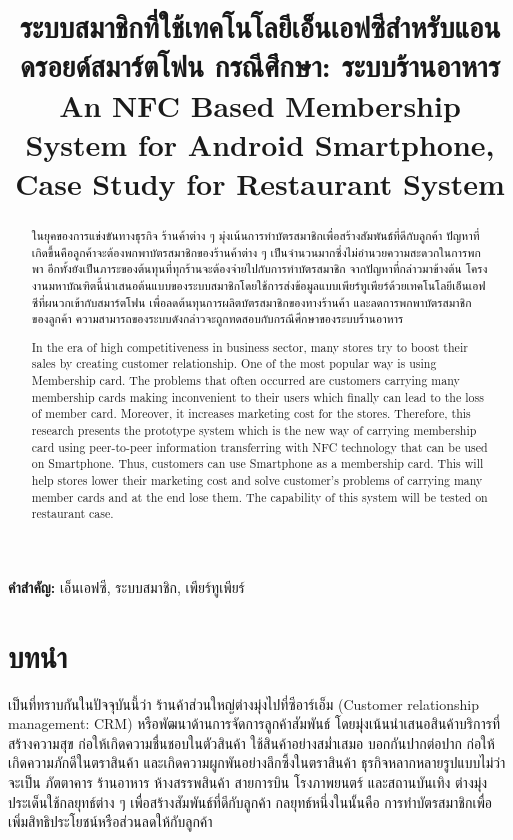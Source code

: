 \documentclass[12pt,a4paper,twocolumn]{article}
\title{ระบบสมาชิกที่ใช้เทคโนโลยีเอ็นเอฟซีสำหรับแอนดรอยด์สมาร์ตโฟน กรณีศึกษา: ระบบร้านอาหาร\\An NFC Based Membership System for Android Smartphone,\\Case Study for Restaurant System}
\author{}
\date{}
\renewcommand\abstractname{บทคัดย่อ}
\begin{document}
\maketitle
\thispagestyle{empty}
\pagestyle{empty}

\begin{abstract}
ในยุคของการแข่งขันทางธุรกิจ ร้านค้าต่าง ๆ มุ่งเน้นการทำบัตรสมาชิกเพื่อสร้างสัมพันธ์ที่ดีกับลูกค้า ปัญหาที่เกิดขึ้นคือลูกค้าจะต้องพกพาบัตรสมาชิกของร้านค้าต่าง ๆ เป็นจำนวนมากซึ่งไม่อำนวยความสะดวกในการพกพา อีกทั้งยังเป็นภาระของต้นทุนที่ทุกร้านจะต้องจ่ายไปกับการทำบัตรสมาชิก จากปัญหาที่กล่าวมาข้างต้น โครงงานมหาบัณฑิตนี้นำเสนอต้นแบบของระบบสมาชิกโดยใช้การส่งข้อมูลแบบเพียร์ทูเพียร์ด้วยเทคโนโลยีเอ็นเอฟซีที่ผนวกเข้ากับสมาร์ตโฟน เพื่อลดต้นทุนการผลิตบัตรสมาชิกของทางร้านค้า และลดการพกพาบัตรสมาชิกของลูกค้า ความสามารถของระบบดังกล่าวจะถูกทดสอบกับกรณีศึกษาของระบบร้านอาหาร
\end{abstract}

\renewcommand\abstractname{Abstract}
\begin{abstract}
In the era of high competitiveness in business sector, many stores try to boost their sales by creating customer relationship. One of the most popular way is using Membership card. The problems that often occurred are customers carrying many membership cards making inconvenient to their users which finally can lead to the loss of member card. Moreover, it increases marketing cost for the stores. Therefore, this research presents the prototype system which is the new way of carrying membership card using peer-to-peer information transferring with NFC technology that can be used on Smartphone. Thus, customers can use Smartphone as a membership card.  This will help stores lower their marketing cost and solve customer’s problems of carrying many member cards and at the end lose them. The capability of this system will be tested on restaurant case.
\end{abstract}

\noindent \textbf{คำสำคัญ:} เอ็นเอฟซี, ระบบสมาชิก, เพียร์ทูเพียร์


\section{บทนำ}
เป็นที่ทราบกันในปัจจุบันนี้ว่า ร้านค้าส่วนใหญ่ต่างมุ่งไปที่ซีอาร์เอ็ม (Customer relationship management: CRM) หรือพัฒนาด้านการจัดการลูกค้าสัมพันธ์ โดยมุ่งเน้นนำเสนอสินค้าบริการที่สร้างความสุข ก่อให้เกิดความชื่นชอบในตัวสินค้า ใช้สินค้าอย่างสม่ำเสมอ บอกกันปากต่อปาก ก่อให้เกิดความภักดีในตราสินค้า และเกิดความผูกพันอย่างลึกซึ้งในตราสินค้า ธุรกิจหลากหลายรูปแบบไม่ว่าจะเป็น ภัตตาคาร ร้านอาหาร ห้างสรรพสินค้า สายการบิน โรงภาพยนตร์ และสถานบันเทิง ต่างมุ่งประเด็นใช้กลยุทธ์ต่าง ๆ เพื่อสร้างสัมพันธ์ที่ดีกับลูกค้า กลยุทธ์หนึ่งในนั้นคือ การทำบัตรสมาชิกเพื่อเพิ่มสิทธิประโยชน์หรือส่วนลดให้กับลูกค้า
\end{document}
